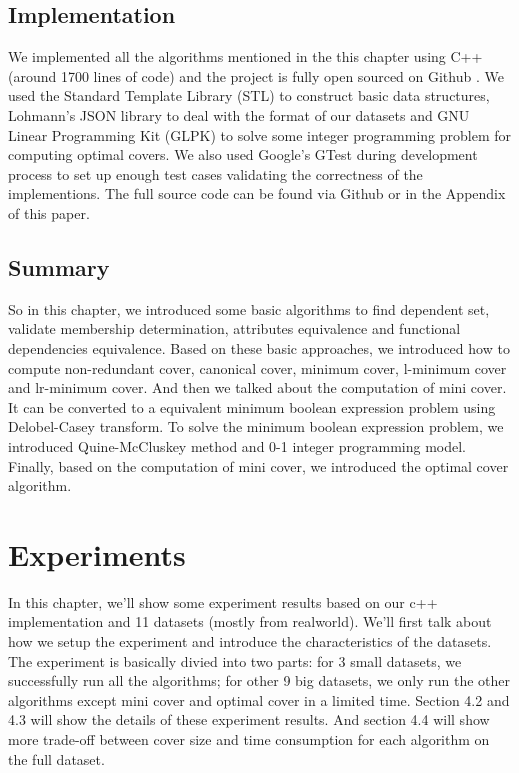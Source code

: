 \documentclass[11pt]{book}
\begin{document}
\section{Implementation}

We implemented all the algorithms mentioned in the this chapter using C++ (around 1700 lines of code) and the project is fully open sourced on Github \cite{githubfdc}. We used the Standard Template Library (STL) \cite{plauger2000c++} to construct basic data structures, Lohmann's JSON library \cite{nlohmann_json} to deal with the format of our datasets and GNU Linear Programming Kit (GLPK) \cite{makhorin2008glpk} to solve some integer programming problem for computing optimal covers. We also used Google's GTest \cite{barca2016gtest} during development process to set up enough test cases validating the correctness of the implementions. The full source code can be found via Github \cite{githubfdc} or in the Appendix of this paper.




\section{Summary}

So in this chapter, we introduced some basic algorithms to find dependent set, validate membership determination, attributes equivalence and functional dependencies equivalence. Based on these basic approaches, we introduced how to compute non-redundant cover, canonical cover, minimum cover, l-minimum cover and lr-minimum cover. And then we talked about the computation of mini cover. It can be converted to a equivalent minimum boolean expression problem using Delobel-Casey transform. To solve the minimum boolean expression problem, we introduced Quine-McCluskey method and 0-1 integer programming model. Finally, based on the computation of mini cover, we introduced the optimal cover algorithm.

\chapter{Experiments}

In this chapter, we'll show some experiment results based on our c++ implementation and 11 datasets (mostly from realworld). We'll first talk about how we setup the experiment and introduce the characteristics of the datasets. The experiment is basically divied into two parts: for 3 small datasets, we successfully run all the algorithms; for other 9 big datasets, we only run the other algorithms except mini cover and optimal cover in a limited time. Section 4.2 and 4.3 will show the details of these experiment results. And section 4.4 will show more trade-off between cover size and time consumption for each algorithm on the full dataset.
\end{document}
